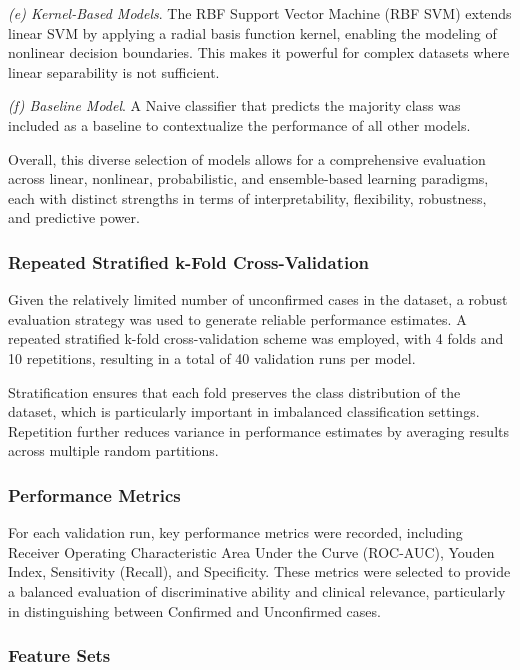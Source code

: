 \documentclass[fleqn,10pt]{wlscirep}
\begin{document}
\textit{(e) Kernel-Based Models}.
The RBF Support Vector Machine (RBF SVM) extends linear SVM by applying a radial basis function kernel, enabling the modeling of nonlinear decision boundaries. This makes it powerful for complex datasets where linear separability is not sufficient.

\textit{(f) Baseline Model}.
A Naive classifier that predicts the majority class was included as a baseline to contextualize the performance of all other models.

Overall, this diverse selection of models allows for a comprehensive evaluation across linear, nonlinear, probabilistic, and ensemble-based learning paradigms, each with distinct strengths in terms of interpretability, flexibility, robustness, and predictive power.

\subsubsection*{Repeated Stratified k-Fold Cross-Validation}

Given the relatively limited number of unconfirmed cases in the dataset, a robust evaluation strategy was used to generate reliable performance estimates. A repeated stratified k-fold cross-validation scheme was employed, with 4 folds and 10 repetitions, resulting in a total of 40 validation runs per model.

Stratification ensures that each fold preserves the class distribution of the dataset, which is particularly important in imbalanced classification settings. Repetition further reduces variance in performance estimates by averaging results across multiple random partitions.

\subsubsection*{Performance Metrics}
For each validation run, key performance metrics were recorded, including Receiver Operating Characteristic Area Under the Curve (ROC-AUC), Youden Index, Sensitivity (Recall), and Specificity. These metrics were selected to provide a balanced evaluation of discriminative ability and clinical relevance, particularly in distinguishing between Confirmed and Unconfirmed cases.

\subsubsection*{Feature Sets}
\end{document}
